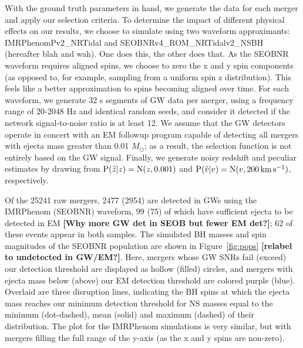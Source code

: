 \documentclass[twocolumn]{aastex63}
\newcommand{\vobs}{\ensuremath{\hat{v}}}
\newcommand{\zobs}{\ensuremath{\hat{z}}}
\newcommand{\prob}{\ensuremath{{\rm P}}}
\newcommand{\normal}{{\rm{N}}}
\newcommand{\kms}{\ensuremath{{\rm km\,s^{-1}}}}
\begin{document}
With the ground truth parameters in hand, we generate the data for each merger and apply our selection criteria.  To determine the impact of different physical effects on our results, we choose to simulate using two waveform approximants: IMRPhenomPv2\_NRTidal and SEOBNRv4\_ROM\_NRTidalv2\_NSBH (hereafter blah and wah). One does this, the other does that. As the SEOBNR waveform requires aligned spins, we choose to zero the x and y spin components (as opposed to, for example, sampling from a uniform spin z distribution). This feels like a better approximation to spins becoming aligned over time. For each waveform, we generate 32 s segments of GW data per merger, using a frequency range of 20-2048 Hz and identical random seeds, and consider it detected if the network signal-to-noise ratio is at least 12. We assume that the GW detectors operate in concert with an EM followup program capable of detecting all mergers with ejecta mass greater than 0.01 $M_\odot$; as a result, the selection function is not entirely based on the GW signal. Finally, we generate noisy redshift and peculiar estimates by drawing from $\prob(\zobs|z)=\normal(z,0.001)$ and $\prob(\vobs|v)=\normal(v,200\,\kms)$, respectively.

Of the 25241 raw mergers, 2477 (2954) are detected in GWs using the IMRPhenom (SEOBNR) waveform, 99 (75) of which have sufficient ejecta to be detected in EM {\bf [Why more GW det in SEOB but fewer EM det?]}; 62 of these events appear in both samples. The simulated BH masses and spin magnitudes of the SEOBNR population are shown in Figure~\ref{fig:pops} {\bf [relabel to undetected in GW/EM?]}. Here, mergers whose GW SNRs fail (exceed) our detection threshold are displayed as hollow (filled) circles, and mergers with ejecta mass below (above) our EM detection threshold are colored purple (blue). Overlaid are three disruption lines, indicating the BH spins at which the ejecta mass reaches our minimum detection threshold for NS masses equal to the minimum (dot-dashed), mean (solid) and maximum (dashed) of their distribution. The plot for the IMRPhenom simulations is very similar, but with mergers filling the full range of the y-axis (as the x and y spins are non-zero).

\begin{figure*}[ht!]
\caption{Ground-truth (left) and inferred (right) properties of simulated NSBH binaries. (Left) Most systems are not detected in GWs (empty circles). Those with low BH mass and high BH spin are most likely to produce ejecta and thus EM emission (blue circles). (Right) Posterior inference for these systems, clearly indicating the preferred region of parameter space.\label{fig:pops}}
\end{figure*}
\end{document}

